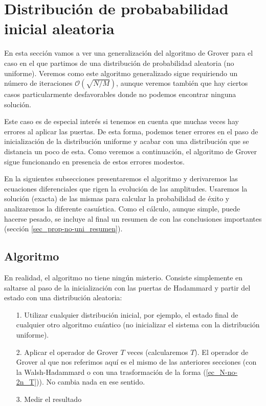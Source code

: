 \documentclass[a4paper,11pt]{book} %
\numberwithin{equation}{chapter}
\begin{document}





\section{Distribución de probababilidad inicial aleatoria} \label{sec_arbitrary_distribition}

En esta sección vamos a ver una generalización del algoritmo de Grover para el caso en el que partimos de una distribución de probabilidad aleatoria (no uniforme). Veremos como este algoritmo generalizado sigue requiriendo un número de iteraciones $\mathcal{O}(\sqrt{N/M})$, aunque veremos también que hay ciertos casos particularmente desfavorables donde no podemos encontrar ninguna solución. 


Este caso es de especial interés si tenemos en cuenta que muchas veces hay errores al aplicar las puertas. De esta forma, podemos tener errores en el paso de inicialización de la distribución uniforme y acabar con una distribución que se distancia un poco de esta. Como veremos a continuación, el algoritmo de Grover sigue funcionando en presencia de estos errores modestos.

En la siguientes subsecciones presentaremos el algoritmo y derivaremos las ecuaciones diferenciales que rigen la evolución de las amplitudes. Usaremos la solución (exacta) de las mismas para calcular la probabilidad de éxito y analizaremos la diferente casuística. Como el cálculo, aunque simple, puede hacerse pesado, se incluye al final un resumen de con las conclusiones importantes (sección \ref{sec_prop-no-uni_resumen}).

\subsection{Algoritmo}

En realidad, el algoritmo no tiene ningún misterio. Consiste simplemente en saltarse al paso de la inicialización con las puertas de Hadammard y partir del estado con una distribución aleatoria:

\begin{itemize}
	\item[1.] Utilizar cualquier distribución inicial, por ejemplo, el estado final de cualquier otro algoritmo cuántico (no inicializar el sistema con la distribución uniforme).
	
	\item[2.] Aplicar el operador de Grover $T$ veces (calcularemos $T$). El operador de Grover al que nos referimos aquí es el mismo de las anteriores secciones (con la Walsh-Hadammard o con una trasformación de la forma (\ref{ec_N-no-2n_T})). No cambia nada en ese sentido.
	
	\item[3.] Medir el resultado
\end{itemize}
\end{document}

